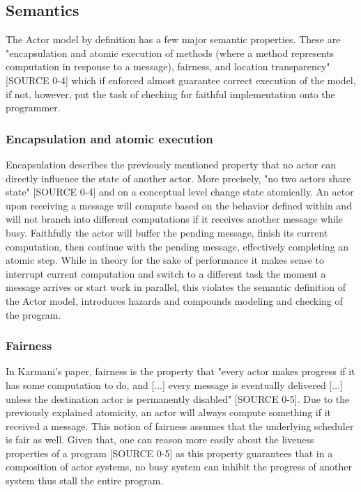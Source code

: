 \documentclass[A4]{article}
\begin{document}
\subsection{Semantics}
The Actor model by definition has a few major semantic properties. These are "encapsulation and atomic execution of methods (where a method represents computation in response to a message), fairness, and location transparency" [SOURCE 0-4] which if enforced almost guarantee correct execution of the model, if not, however, put the task of checking for faithful implementation onto the programmer. 
\subsubsection{Encapsulation and atomic execution}
Encapsulation describes the previously mentioned property that no actor can directly influence the state of another actor. More precisely, "no two actors share state" [SOURCE 0-4] and on a conceptual level change state atomically. An actor upon receiving a message will compute based on the behavior defined within and will not branch into different computations if it receives another message while busy. Faithfully the actor will buffer the pending message, finish its current computation, then continue with the pending message, effectively completing an atomic step. 
While in theory for the sake of performance it makes sense to interrupt current computation and switch to a different task the moment a message arrives or start work in parallel, this violates the semantic definition of the Actor model, introduces hazards and compounds modeling and checking of the program. 
\subsubsection{Fairness}
In Karmani's paper, fairness is the property that "every actor makes progress if it has some computation to do, and [...] every message is eventually delivered [...] unless the destination actor is permanently disabled" [SOURCE 0-5]. Due to the previously explained atomicity, an actor will always compute something if it received a message. 
This notion of fairness assumes that the underlying scheduler is fair as well. 
Given that, one can reason more easily about the liveness properties of a program [SOURCE 0-5] as this property guarantees that in a composition of actor systems, no busy system can inhibit the progress of another system thus stall the entire program.
\end{document}
